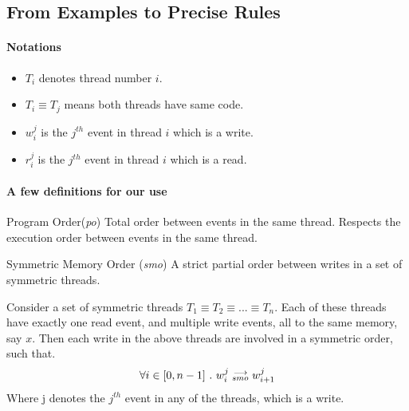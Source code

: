\subsection{From Examples to Precise Rules}

    \paragraph{Notations}
        \begin{itemize}
            \item $T_i$ denotes thread number $i$.
            \item $T_i \equiv T_j$ means both threads have same code.
            \item $w_i^j$ is the $j^{th}$ event in thread $i$ which is a write.
            \item $r_i^j$ is the $j^{th}$ event in thread $i$ which is a read. 
        \end{itemize}

    
    \paragraph{A few definitions for our use}

    \begin{definition}{Program Order(\emph{po})}
        \label{ProgO}
        Total order between events in the same thread. Respects the execution order between events in the same thread. 
    \end{definition}

    \begin{definition}{Symmetric Memory Order (\emph{smo})}
        \label{SymMemO}
        A strict partial order between writes in a set of symmetric threads. 
        
        Consider a set of symmetric threads $T_1 \equiv T_2 \equiv ... \equiv T_n$. 
        Each of these threads have exactly one read event, and multiple write events, all to the same memory, say $x$. 
        Then each write in the above threads are involved in a symmetric order, such that. 
        \begin{align*}
            \forall i \in [0, n-1] \ . \ w_i^j\stackrel{\longrightarrow}{_{smo}}w_{i+1}^j
        \end{align*}
        Where j denotes the $j^{th}$ event in any of the threads, which is a write.
    \end{definition}


